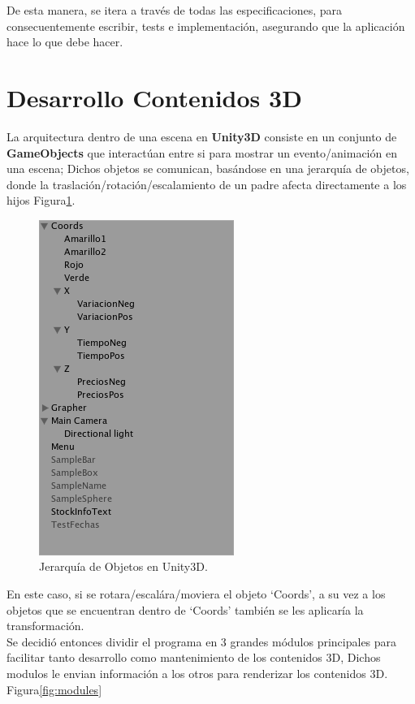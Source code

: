 De esta manera, se itera a través de todas las especificaciones, para consecuentemente escribir, tests e implementación, asegurando que la aplicación hace lo que debe hacer.


\section{Desarrollo Contenidos 3D}
La arquitectura dentro de una escena en \textbf{Unity3D} consiste en un conjunto de \textbf{GameObjects} que interactúan entre si para mostrar un evento/animación en una escena; Dichos objetos se comunican, basándose en una jerarquía de objetos, donde la traslación/rotación/escalamiento de un padre afecta directamente a los hijos Figura\ref{fig:jerarq}.\\


\begin{figure}[h]
	\centering
		\includegraphics[scale=0.5]{parenting.png}
		\caption{Jerarquía de Objetos en Unity3D.}
	\label{fig:jerarq}
\end{figure}

En este caso, si se rotara/escalára/moviera el objeto `Coords', a su vez a los objetos que se encuentran dentro de `Coords' también se les aplicaría la transformación.\\

Se decidió entonces dividir el programa en 3 grandes módulos principales para facilitar tanto desarrollo como mantenimiento de los contenidos 3D, Dichos modulos le envian información a los otros para renderizar los contenidos 3D. Figura\ref{fig:modules}\\

